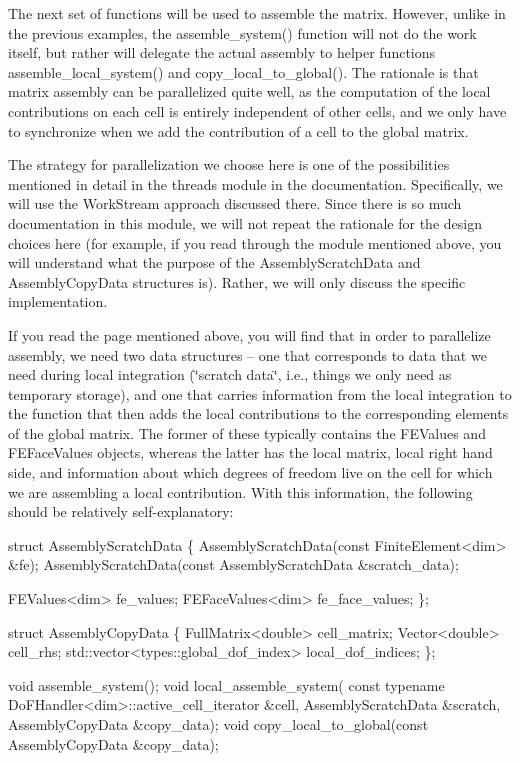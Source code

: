 The next set of functions will be used to assemble the matrix. However, unlike in the previous examples, the {\ttfamily assemble\+\_\+system()} function will not do the work itself, but rather will delegate the actual assembly to helper functions {\ttfamily assemble\+\_\+local\+\_\+system()} and {\ttfamily copy\+\_\+local\+\_\+to\+\_\+global()}. The rationale is that matrix assembly can be parallelized quite well, as the computation of the local contributions on each cell is entirely independent of other cells, and we only have to synchronize when we add the contribution of a cell to the global matrix.

The strategy for parallelization we choose here is one of the possibilities mentioned in detail in the threads module in the documentation. Specifically, we will use the Work\+Stream approach discussed there. Since there is so much documentation in this module, we will not repeat the rationale for the design choices here (for example, if you read through the module mentioned above, you will understand what the purpose of the {\ttfamily Assembly\+Scratch\+Data} and {\ttfamily Assembly\+Copy\+Data} structures is). Rather, we will only discuss the specific implementation.

If you read the page mentioned above, you will find that in order to parallelize assembly, we need two data structures -- one that corresponds to data that we need during local integration (\char`\"{}scratch data\char`\"{}, i.\+e., things we only need as temporary storage), and one that carries information from the local integration to the function that then adds the local contributions to the corresponding elements of the global matrix. The former of these typically contains the F\+E\+Values and F\+E\+Face\+Values objects, whereas the latter has the local matrix, local right hand side, and information about which degrees of freedom live on the cell for which we are assembling a local contribution. With this information, the following should be relatively self-\/explanatory\+:


\begin{DoxyCode}
\textcolor{keyword}{struct }AssemblyScratchData \{
    AssemblyScratchData(\textcolor{keyword}{const} FiniteElement<dim> &fe);
    AssemblyScratchData(\textcolor{keyword}{const} AssemblyScratchData &scratch\_data);

    FEValues<dim> fe\_values;
    FEFaceValues<dim> fe\_face\_values;
\};

\textcolor{keyword}{struct }AssemblyCopyData \{
    FullMatrix<double> cell\_matrix;
    Vector<double> cell\_rhs;
    std::vector<types::global\_dof\_index> local\_dof\_indices;
\};

\textcolor{keywordtype}{void} assemble\_system();
\textcolor{keywordtype}{void} local\_assemble\_system(
    \textcolor{keyword}{const} \textcolor{keyword}{typename} DoFHandler<dim>::active\_cell\_iterator &cell,
    AssemblyScratchData &scratch, AssemblyCopyData &copy\_data);
\textcolor{keywordtype}{void} copy\_local\_to\_global(\textcolor{keyword}{const} AssemblyCopyData &copy\_data);
\end{DoxyCode}


